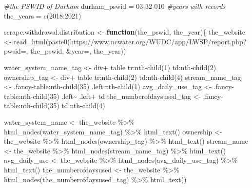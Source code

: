 \documentclass[
  12pt,
]{article}
\newenvironment{Shaded}{\begin{snugshade}}{\end{snugshade}}
\newcommand{\CommentTok}[1]{\textcolor[rgb]{0.56,0.35,0.01}{\textit{#1}}}
\newcommand{\ControlFlowTok}[1]{\textcolor[rgb]{0.13,0.29,0.53}{\textbf{#1}}}
\newcommand{\DecValTok}[1]{\textcolor[rgb]{0.00,0.00,0.81}{#1}}
\newcommand{\FunctionTok}[1]{\textcolor[rgb]{0.00,0.00,0.00}{#1}}
\newcommand{\NormalTok}[1]{#1}
\newcommand{\OtherTok}[1]{\textcolor[rgb]{0.56,0.35,0.01}{#1}}
\newcommand{\SpecialCharTok}[1]{\textcolor[rgb]{0.00,0.00,0.00}{#1}}
\newcommand{\StringTok}[1]{\textcolor[rgb]{0.31,0.60,0.02}{#1}}
\begin{document}
\begin{Shaded}
\begin{Highlighting}[]
\CommentTok{\#the PSWID of Durham}
\NormalTok{durham\_pswid }\OtherTok{=} \StringTok{\textquotesingle{}03{-}32{-}010\textquotesingle{}}
\CommentTok{\#years with records}
\NormalTok{the\_years }\OtherTok{=} \FunctionTok{c}\NormalTok{(}\DecValTok{2018}\SpecialCharTok{:}\DecValTok{2021}\NormalTok{)}

\NormalTok{scrape.withdrawal.distribution }\OtherTok{\textless{}{-}} \ControlFlowTok{function}\NormalTok{(the\_pswid, the\_year)\{}
\NormalTok{  the\_website }\OtherTok{\textless{}{-}} \FunctionTok{read\_html}\NormalTok{(}\FunctionTok{paste0}\NormalTok{(}\StringTok{\textquotesingle{}https://www.ncwater.org/WUDC/app/LWSP/report.php?pwsid=\textquotesingle{}}\NormalTok{, }
\NormalTok{                                  the\_pswid, }\StringTok{\textquotesingle{}\&year=\textquotesingle{}}\NormalTok{, the\_year))}
  
\NormalTok{  water\_system\_name\_tag }\OtherTok{\textless{}{-}} \StringTok{\textquotesingle{}div+ table tr:nth{-}child(1) td:nth{-}child(2)\textquotesingle{}}
\NormalTok{  ownership\_tag }\OtherTok{\textless{}{-}} \StringTok{\textquotesingle{}div+ table tr:nth{-}child(2) td:nth{-}child(4)\textquotesingle{}}
\NormalTok{  stream\_name\_tag }\OtherTok{\textless{}{-}} \StringTok{\textquotesingle{}.fancy{-}table:nth{-}child(35) .left:nth{-}child(1)\textquotesingle{}}
\NormalTok{  avg\_daily\_use\_tag }\OtherTok{\textless{}{-}} \StringTok{\textquotesingle{}.fancy{-}table:nth{-}child(35) .left\textasciitilde{} .left+ td\textquotesingle{}}
\NormalTok{  the\_numberofdaysused\_tag }\OtherTok{\textless{}{-}} \StringTok{\textquotesingle{}.fancy{-}table:nth{-}child(35) td:nth{-}child(4)\textquotesingle{}}
  
\NormalTok{  water\_system\_name }\OtherTok{\textless{}{-}}\NormalTok{ the\_website }\SpecialCharTok{\%\textgreater{}\%} \FunctionTok{html\_nodes}\NormalTok{(water\_system\_name\_tag) }\SpecialCharTok{\%\textgreater{}\%} \FunctionTok{html\_text}\NormalTok{()}
\NormalTok{  ownership }\OtherTok{\textless{}{-}}\NormalTok{ the\_website }\SpecialCharTok{\%\textgreater{}\%}   \FunctionTok{html\_nodes}\NormalTok{(ownership\_tag) }\SpecialCharTok{\%\textgreater{}\%}  \FunctionTok{html\_text}\NormalTok{()}
\NormalTok{  stream\_name }\OtherTok{\textless{}{-}}\NormalTok{ the\_website }\SpecialCharTok{\%\textgreater{}\%} \FunctionTok{html\_nodes}\NormalTok{(stream\_name\_tag) }\SpecialCharTok{\%\textgreater{}\%} \FunctionTok{html\_text}\NormalTok{()}
\NormalTok{  avg\_daily\_use }\OtherTok{\textless{}{-}}\NormalTok{ the\_website }\SpecialCharTok{\%\textgreater{}\%} \FunctionTok{html\_nodes}\NormalTok{(avg\_daily\_use\_tag) }\SpecialCharTok{\%\textgreater{}\%} \FunctionTok{html\_text}\NormalTok{()}
\NormalTok{  the\_numberofdaysused }\OtherTok{\textless{}{-}}\NormalTok{ the\_website }\SpecialCharTok{\%\textgreater{}\%} \FunctionTok{html\_nodes}\NormalTok{(the\_numberofdaysused\_tag) }\SpecialCharTok{\%\textgreater{}\%} \FunctionTok{html\_text}\NormalTok{()}
  

\end{Highlighting}
\end{Shaded}
\end{document}

